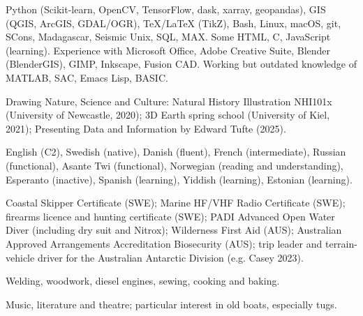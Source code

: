 \documentclass[11pt, a4paper]{cvClass}
\begin{document}

\begin{cvparagraph}
Python (Scikit-learn, OpenCV, TensorFlow, dask, xarray, geopandas), GIS (QGIS, ArcGIS, GDAL/OGR), TeX/LaTeX (TikZ), Bash, Linux, macOS, git, SCons, Madagascar, Seismic Unix, SQL, MAX. Some HTML, C, JavaScript (learning). Experience with Microsoft Office, Adobe Creative Suite, Blender (BlenderGIS), GIMP, Inkscape, Fusion CAD. Working but outdated knowledge of MATLAB, SAC, Emacs Lisp, BASIC.
\end{cvparagraph}

\begin{cvparagraph}
Drawing Nature, Science and Culture: Natural History Illustration NHI101x (University of Newcastle, 2020); 3D Earth spring school (University of Kiel, 2021); Presenting Data and Information by Edward Tufte (2025).
\end{cvparagraph}

\begin{cvparagraph}
English (C2), Swedish (native), Danish (fluent), French (intermediate), Russian (functional), Asante Twi (functional), Norwegian (reading and understanding), Esperanto (inactive), Spanish (learning), Yiddish (learning), Estonian (learning).
\end{cvparagraph}

\begin{cvparagraph}
Coastal Skipper Certificate (SWE); Marine HF/VHF Radio Certificate (SWE); firearms licence and hunting certificate (SWE); PADI Advanced Open Water Diver (including dry suit and Nitrox); Wilderness First Aid (AUS); Australian Approved Arrangements Accreditation Biosecurity (AUS); trip leader and terrain-vehicle driver for the Australian Antarctic Division (e.g. Casey 2023).
\end{cvparagraph}

\begin{cvparagraph}
Welding, woodwork, diesel engines, sewing, cooking and baking.
\end{cvparagraph}

\begin{cvparagraph}
Music, literature and theatre; particular interest in old boats, especially tugs.
\end{cvparagraph}
\end{document}
